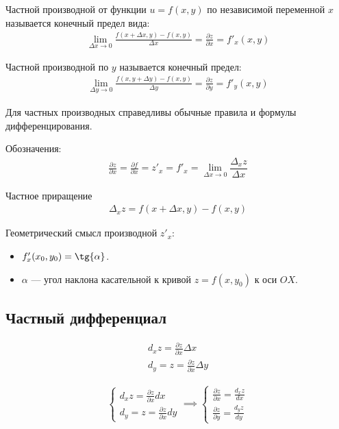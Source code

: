 \documentclass[a4paper,12pt,oneside]{extbook}
\theoremstyle{numbered}
\theoremstyle{unnumbered}
\theoremstyle{named}
\theoremstyle{unnumbered}
\theoremstyle{named}
\theoremstyle{named}
\theoremstyle{named}
\begin{document}
\begin{siderules}
    Частной производной от функции \(u = f(x, y)\) по независимой переменной \(x\) называется конечный предел вида:
    \begin{gather*}
        \lim_{\Delta x \to 0}{\frac{f(x + \Delta x, y) - f(x, y)}{\Delta x}} = \frac{\partial z}{\partial x} = f'_x (x, y)
    \end{gather*}

    Частной производной по \(y\) называется конечный предел:
    \begin{gather*}
        \lim_{\Delta y \to 0}{\frac{f(x, y + \Delta y) - f(x, y)}{\Delta y}} = \frac{\partial z}{\partial y} = f'_y (x, y)
    \end{gather*}

    Для частных производных справедливы обычные правила и формулы дифференцирования.
\end{siderules}

Обозначения:
\begin{gather*}
    \frac{\partial z}{\partial x} = \frac{\partial f}{\partial x} = z'_x = f'_x = \lim_{\Delta x \to 0}{\dfrac{\Delta_x z}{\Delta x}}
\end{gather*}

Частное приращение
\begin{gather*}
    \Delta_x z = f(x + \Delta x, y) - f(x, y)
\end{gather*}

Геометрический смысл производной \(z'_x\):
\begin{itemize}
    \item {\(f'_x(x_0, y_0) = \tg{\alpha}\).}
    \item {\(\alpha\) — угол наклона касательной к кривой \(z = f(x, y_0)\) к оси \(OX\).}
\end{itemize}


\subsection{Частный дифференциал}%
\label{sub:Частный дифференциал}

\begin{gather*}
    d_x z = \frac{\partial z}{\partial x} \Delta x \\
    d_y = z = \frac{\partial z}{\partial x} \Delta y
\end{gather*}

\begin{gather*}
    \begin{cases}
        d_x z = \frac{\partial z}{\partial x} dx \\
        d_y = z = \frac{\partial z}{\partial x} dy
    \end{cases}
    \implies
    \begin{cases}
        \frac{\partial z}{\partial x} = \frac{d_x z}{dx} \\
        \frac{\partial z}{\partial y} = \frac{d_y z}{dy}
    \end{cases}
\end{gather*}
\end{document}
